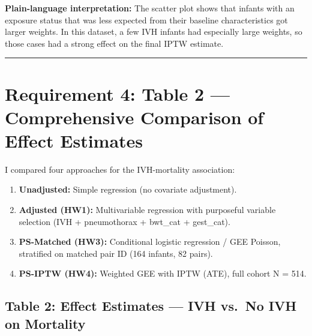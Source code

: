 \documentclass[
]{article}
\providecommand{\tightlist}{%
  \setlength{\itemsep}{0pt}\setlength{\parskip}{0pt}}
\begin{document}
\textbf{Plain-language interpretation:} The scatter plot shows that
infants with an exposure status that was less expected from their
baseline characteristics got larger weights. In this dataset, a few IVH
infants had especially large weights, so those cases had a strong effect
on the final IPTW estimate.

\begin{center}\rule{0.5\linewidth}{0.5pt}\end{center}

\hypertarget{requirement-4-table-2-comprehensive-comparison-of-effect-estimates}{%
\section{Requirement 4: Table 2 --- Comprehensive Comparison of Effect
Estimates}\label{requirement-4-table-2-comprehensive-comparison-of-effect-estimates}}

I compared four approaches for the IVH-mortality association:

\begin{enumerate}
\def\labelenumi{\arabic{enumi}.}
\tightlist
\item
  \textbf{Unadjusted:} Simple regression (no covariate adjustment).
\item
  \textbf{Adjusted (HW1):} Multivariable regression with purposeful
  variable selection (IVH + pneumothorax + bwt\_cat + gest\_cat).
\item
  \textbf{PS-Matched (HW3):} Conditional logistic regression / GEE
  Poisson, stratified on matched pair ID (164 infants, 82 pairs).
\item
  \textbf{PS-IPTW (HW4):} Weighted GEE with IPTW (ATE), full cohort N =
  514.
\end{enumerate}

\hypertarget{table-2-effect-estimates-ivh-vs.-no-ivh-on-mortality}{%
\subsection{Table 2: Effect Estimates --- IVH vs.~No IVH on
Mortality}\label{table-2-effect-estimates-ivh-vs.-no-ivh-on-mortality}}
\end{document}
